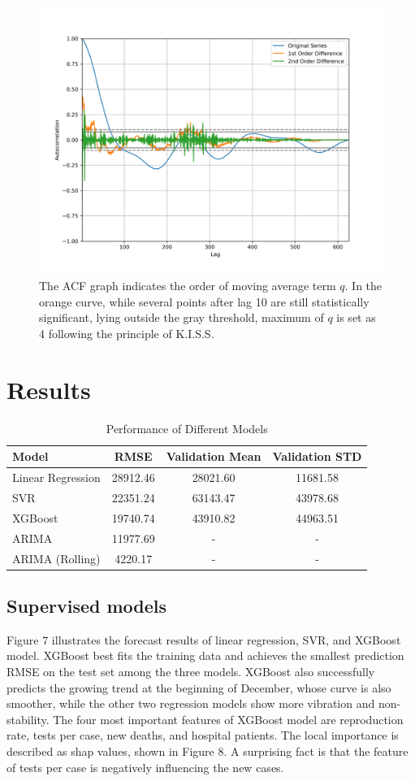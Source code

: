\documentclass[11pt]{article}
\begin{document}
 
 
 \begin{figure}[htb]
 	\setlength{\abovecaptionskip}{0.cm}
 	\centering
 	\includegraphics[width=0.6\linewidth]{../figures/ACF.png} \vspace{-0.1in}
 	\caption{The ACF graph indicates the order of moving average term $q$. In the orange curve, while several points after lag 10 are still statistically significant, lying outside the gray threshold, maximum of $q$ is set as 4 following the principle of K.I.S.S. } 
 \end{figure}


\section{Results}
\begin{table}[htbp]
	\caption{Performance of Different Models}
	\centering
	\begin{tabular}{lccc}
		\toprule
		Model & RMSE& Validation Mean & Validation STD \\
		\midrule
		Linear Regression&28912.46&	28021.60&	11681.58
		\\
		SVR&	22351.24&	63143.47&43978.68
		\\
		XGBoost&19740.74&	43910.82&	44963.51
		\\
		ARIMA&	 11977.69&-&-
		\\
		ARIMA (Rolling)&	4220.17&-&-
		\\
		\bottomrule
	\end{tabular}
\end{table}
\subsection{Supervised models}
Figure 7 illustrates the forecast results of linear regression, SVR, and XGBoost model. XGBoost best fits the training data and achieves the smallest prediction RMSE on the test set among the three models. XGBoost also successfully predicts the growing trend at the beginning of December, whose curve is also smoother, while the other two regression models show more vibration and non-stability. The four most important features of XGBoost model are reproduction rate, tests per case, new deaths, and hospital patients. The local importance is described as shap values, shown in Figure 8. A surprising fact is that the feature of tests per case is negatively influencing the new cases.\\
\end{document}
